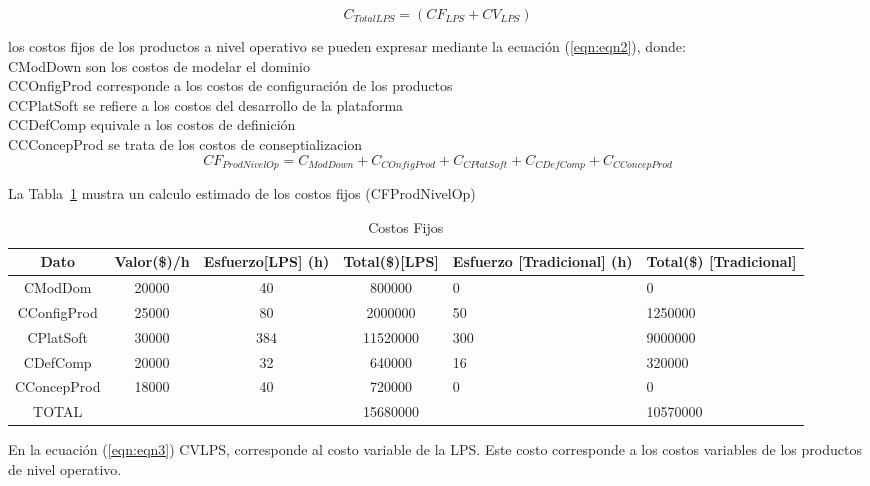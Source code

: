 \documentclass[10pt,a4paper,openany]{book}
\begin{document}
\begin{equation}
C_{TotalLPS} = (CF_{LPS} + CV_{LPS})
\label{eqn:eqn1}
\end{equation}

los costos fijos de los productos a nivel operativo se pueden expresar mediante la ecuación (\ref{eqn:eqn2}), donde: \\
  CModDown son los costos de modelar el dominio \\
  CCOnfigProd corresponde a los costos de configuración de los productos\\
  CCPlatSoft se refiere a los costos del desarrollo de la plataforma \\
  CCDefComp equivale a los costos de definición \\
  CCConcepProd se trata de los costos de conseptializacion\\
\begin{equation}
CF_{ProdNivelOp} = C_{ModDown} + C_{COnfigProd} + C_{CPlatSoft} + C_{CDefComp} + C_{CConcepProd}  
\label{eqn:eqn2}
\end{equation}


La Tabla~\ref{table:t1} mustra un calculo estimado de los costos fijos (CFProdNivelOp)
 
\begin{table}[htbp]
\centering
\begin{tabular}{|c|c|c|c|p{2.5cm}|p{2.5cm}|} \hline
 Dato & Valor(\$)/h & Esfuerzo[LPS] (h) & Total(\$)[LPS] & Esfuerzo [Tradicional] (h) & Total(\$) [Tradicional]\\[0.5ex] \hline
 CModDom     & 20000 & 40  & 800000   & 0   & 0 \\[0.5ex] \hline
 CConfigProd & 25000 & 80  & 2000000  & 50  & 1250000 \\[0.5ex] \hline
 CPlatSoft   & 30000 & 384 & 11520000 & 300 & 9000000 \\[0.5ex] \hline
 CDefComp    & 20000 & 32  & 640000   & 16  & 320000  \\[0.5ex] \hline
 CConcepProd & 18000 & 40  & 720000   & 0   & 0       \\[0.5ex] \hline
 TOTAL &  &  & 15680000 & & 10570000\\[0.5ex] \hline
\end{tabular}
\caption{Costos Fijos}
\label{table:t1}
\end{table}

En la ecuación (\ref{eqn:eqn3}) CVLPS, corresponde al costo variable de la LPS. Este costo corresponde a los costos variables de los productos de nivel operativo.
\end{document}
